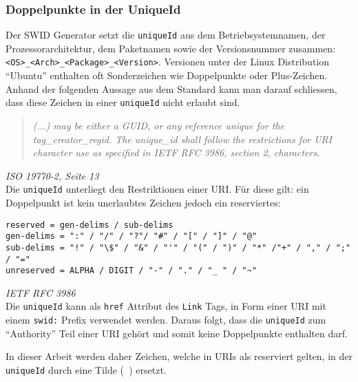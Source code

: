 \subsubsection{Doppelpunkte in der UniqueId} 
Der SWID Generator setzt die \texttt{uniqueId} aus dem Betriebsystemnamen, der
Prozessorarchitektur, dem Paketnamen sowie der Versionsnummer zusammen:
\texttt{<OS>\_<Arch>\_<Package>\_<Version>}. Versionen unter der Linux
Distribution \enquote{Ubuntu} enthalten oft Sonderzeichen wie Doppelpunkte oder
Plus-Zeichen. Anhand der folgenden Aussage aus dem Standard kann man darauf
schliessen, dass diese Zeichen in einer \texttt{uniqueId} nicht erlaubt sind.

\begin{quote}
\textit{(...) may be either a GUID, or any reference unique
for the tag\_creator\_regid. The unique\_id shall follow the restrictions for
URI character use as specified in IETF RFC 3986, section 2, characters.}
\end{quote} 
\textit{ISO 19770-2\cite{iso19770-2}, Seite 13}\\

Die \texttt{uniqueId} unterliegt den Restriktionen einer URI. Für diese gilt: ein
Doppelpunkt ist kein unerlaubtes Zeichen jedoch ein reserviertes:

\begin{verbatim} 
reserved = gen-delims / sub-delims 
gen-delims = ":" / "/" / "?"/ "#" / "[" / "]" / "@" 
sub-delims = "!" / "\$" / "&" / "'" / "(" / ")" / "*" /"+" / "," / ";" / "=" 
unreserved = ALPHA / DIGIT / "-" / "." / "_ " / "~"
\end{verbatim}
\textit{IETF RFC 3986\cite{berners2005rfc}}\\

Die \texttt{uniqueId} kann als \texttt{href} Attribut des \texttt{Link} Tags, in Form
einer URI mit einem \texttt{swid:} Prefix verwendet werden. Daraus folgt, dass
die \texttt{uniqueId} zum \enquote{Authority} Teil einer URI gehört und somit
keine Doppelpunkte enthalten darf.

In dieser Arbeit werden daher Zeichen, welche in URIs als reserviert gelten, in
der \texttt{uniqueId} durch eine Tilde (\texttt{~}) ersetzt.
